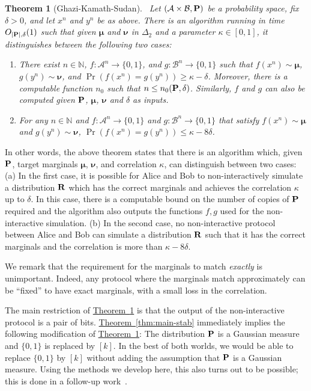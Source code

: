 \documentclass[11pt]{article}
\numberwithin{equation}{section}
\newtheorem{theorem}{Theorem}[section]
\theoremstyle{definition}
\theoremstyle{plain}
\newcommand{\expref}[2]{\hyperref[#2]{#1~\ref{#2}}}
\newcommand{\bP}{{\bf P}}
\newcommand{\bR}{{\bf R}}
\begin{document}
\begin{theorem}[{Ghazi-Kamath-Sudan}]~\label{thm:GKS}
    Let $(\mathcal{A} \times \mathcal{B}, \bP)$ be a probability space, fix $\delta > 0$,
    and let $x^n$ and $y^n$ be as above. 
There is an algorithm running in time $O_{| \bP|, \delta}(1)$ such that
given $\boldsymbol{\mu}$ and $\boldsymbol{\nu}$ in $\Delta_2$ and a parameter $\kappa \in [0,1]$, it distinguishes between the following two cases: 
\begin{enumerate}
  \item There exist $n \in \mathbb{N}$,
    $f: \mathcal{A}^n \rightarrow \{0, 1\}$, and
    $g: \mathcal{B}^n \rightarrow \{0, 1\}$ such that $f(x^n) \sim
    \boldsymbol{\mu}$, $g(y^n) \sim \boldsymbol{\nu}$, and $\Pr(f(x^n) =
    g(y^n)) \ge \kappa - \delta$. Moreover, 
    there is a computable function $n_0$ such that $ n \le n_0  
 ( \bP, \delta)$. Similarly, $f$ and $g$ can also be computed given $\bP$, $\boldsymbol{\mu}$, $\boldsymbol{\nu}$ and $\delta$ as inputs. 


  \item For any $n \in \mathbb{N}$ and $f: \mathcal{A}^n \rightarrow \{0, 1\}$
    and $g: \mathcal{B}^n \rightarrow \{0, 1\}$
    that satisfy $f(x^n) \sim
    \boldsymbol{\mu}$ and $g(y^n) \sim \boldsymbol{\nu}$, $\Pr(f(x^n) =
    g(y^n)) \le \kappa - 8\delta$.
\end{enumerate}
\end{theorem}
In other words, the above theorem states that there is an algorithm which, given $\bP$, target marginals $\boldsymbol{\mu}$, $\boldsymbol{\nu}$, and correlation $\kappa$, can distinguish between two cases: (a) In the first case, it is possible for Alice and Bob to non-interactively simulate a distribution $\bR$ which has the correct marginals and achieves the correlation $\kappa$ up to $\delta$. In this case, 
there is a computable bound on the number of copies of $\bP$ required and the algorithm also outputs the functions $f,g$ used for the non-interactive simulation. 
(b) In the second case, no non-interactive protocol between Alice and Bob can simulate a distribution $\bR$ such that it has the correct marginals and the correlation is more than $\kappa  - 8 \delta$.  

We remark that the requirement for the marginals to match \emph{exactly} is
unimportant. Indeed, any protocol where the marginals match approximately
can be ``fixed'' to have exact marginals, with a small loss in the correlation.

The main restriction of \expref{Theorem}{thm:GKS} is that the output of
the non-interactive protocol is a pair of bits. \expref{Theorem}{thm:main-stab}
immediately implies the following modification of \expref{Theorem}{thm:GKS}:
The distribution $\bP$ is a Gaussian measure and $\{0,1\}$ is replaced by $[k]$.
In the best of both worlds, we would be able to replace $\{0, 1\}$ by $[k]$
without adding the assumption that $\bP$ is a Gaussian measure.
Using the methods we develop here, this also turns out to be possible; this is done in a follow-up work~\cite{DMN:17b}. 
\end{document}
